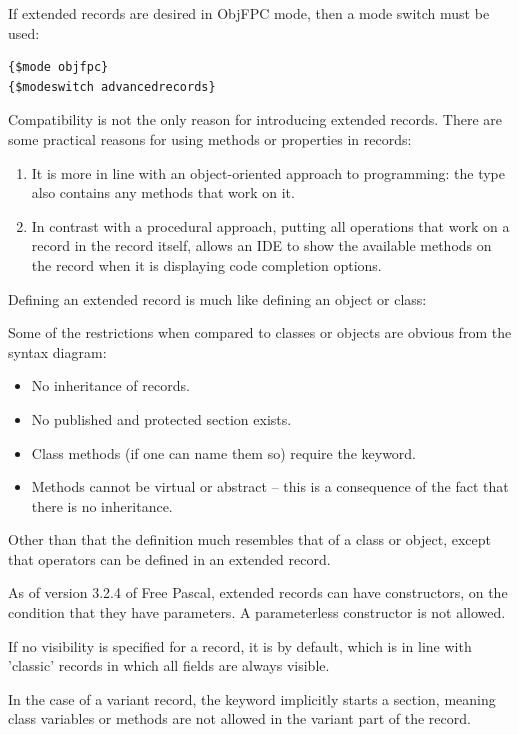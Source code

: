 If extended records are desired in ObjFPC mode, then a mode switch must be
used:
\begin{verbatim}
{$mode objfpc}
{$modeswitch advancedrecords}
\end{verbatim}

Compatibility is not the only reason for introducing extended records.
There are some practical reasons for using methods or properties in records:
\begin{enumerate}
\item It is more in line with an object-oriented approach to programming:
the type also contains any methods that work on it.
\item In contrast with a procedural approach, putting all operations that
work on a record in the record itself, allows an IDE to show the available
methods on the record when it is displaying code completion options.
\end{enumerate}

Defining an extended record is much like defining an object or class:

Some of the restrictions when compared to classes or objects are
obvious from the syntax diagram:
\begin{itemize}
\item No inheritance of records.
\item No published and protected section exists.
\item Class methods (if one can name them so) require the  keyword.
\item Methods cannot be virtual or abstract -- this is a consequence
of the fact that there is no inheritance.
\end{itemize}
Other than that the definition much resembles that of a class or object,
except that operators can be defined in an extended record.

As of version 3.2.4 of Free Pascal, extended records can have constructors, on the
condition that they have parameters. A parameterless constructor is not allowed.


If no visibility is specified for a record, it is  by default,
which is in line with 'classic' records in which all fields are always visible.


\begin{remark}
In the case of a variant record, the  keyword implicitly starts a
 section, meaning class variables or methods are not allowed in the
variant part of the record.
\end{remark}


